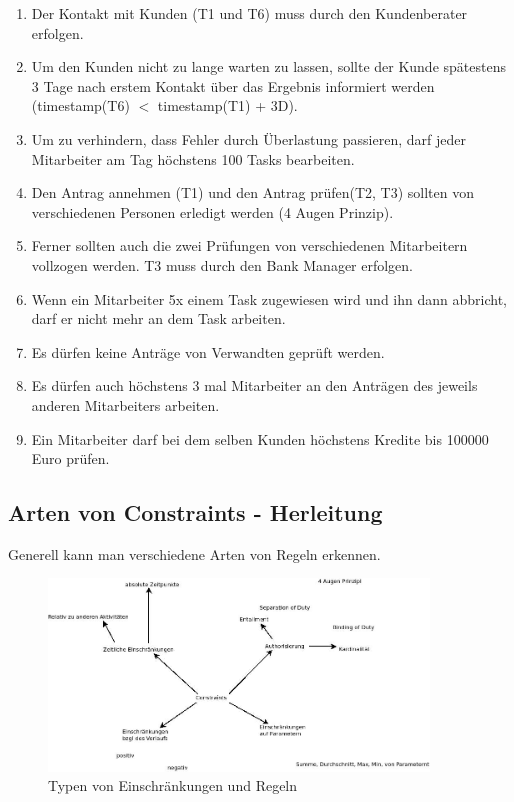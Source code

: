 \begin{enumerate}
\item Der Kontakt mit Kunden (T1 und T6) muss durch den Kundenberater erfolgen.
\item Um den Kunden nicht zu lange warten zu lassen, sollte der Kunde spätestens 3 Tage nach erstem Kontakt über das Ergebnis informiert werden (timestamp(T6) $<$ timestamp(T1) + 3D).
\item Um zu verhindern, dass Fehler durch Überlastung passieren, darf jeder Mitarbeiter am Tag höchstens 100 Tasks bearbeiten.
\item Den Antrag annehmen (T1) und den Antrag prüfen(T2, T3) sollten von verschiedenen Personen erledigt werden (4 Augen Prinzip).
\item Ferner sollten auch die zwei Prüfungen von verschiedenen Mitarbeitern vollzogen werden. T3 muss durch den Bank Manager erfolgen.
\item Wenn ein Mitarbeiter 5x einem Task zugewiesen wird und ihn dann abbricht, darf er nicht mehr an dem Task arbeiten.
\item Es dürfen keine Anträge von Verwandten geprüft werden.
\item Es dürfen auch höchstens 3 mal Mitarbeiter an den Anträgen des jeweils anderen Mitarbeiters arbeiten.
\item Ein Mitarbeiter darf bei dem selben Kunden höchstens Kredite bis 100000 Euro prüfen.
\end{enumerate}


%
%
\subsection{Arten von Constraints - Herleitung}
\label{sec:ArtenConstraints}

Generell kann man verschiedene Arten von Regeln erkennen.\\

\begin{figure}[ht]
	\centering
  \includegraphics[width=0.9\textwidth]{Figures/Constraints}
	\caption{Typen von Einschränkungen und Regeln}
	\label{fig:constraints}
\end{figure}

